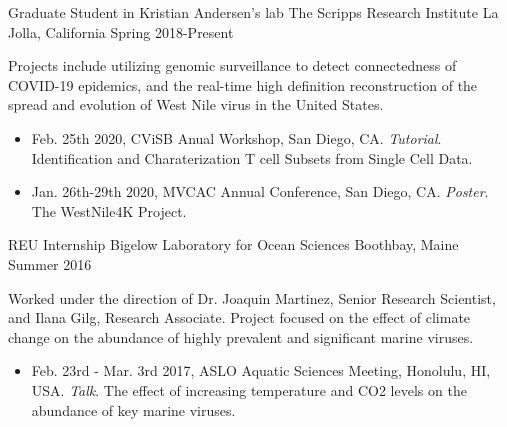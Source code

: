 
\begin{cventries}

  \cventry
    {Graduate Student in Kristian Andersen's lab} %
    {The Scripps Research Institute} %
    {La Jolla, California} %
    {Spring 2018-Present} %
    {
      \begin{cvitems} %
        \item {
          Projects include utilizing genomic surveillance to detect connectedness of COVID-19 epidemics, and the real-time high definition reconstruction of the spread and evolution of West Nile virus in the United States.
          \begin{itemize}
            \item{Feb. 25th 2020, CViSB Anual Workshop, San Diego, CA. \textit{Tutorial}. Identification and Charaterization T cell Subsets from Single Cell Data.}
            \item{Jan. 26th-29th 2020, MVCAC Annual Conference, San Diego, CA. \textit{Poster}. The WestNile4K Project.}
          \end{itemize}
        }
      \end{cvitems}
    }

  \cventry
    {REU Internship} %
    {Bigelow Laboratory for Ocean Sciences} %
    {Boothbay, Maine} %
    {Summer 2016} %
    {
      \begin{cvitems}
        \item{
          Worked under the direction of Dr. Joaquin Martinez, Senior Research Scientist, and Ilana Gilg, Research Associate.
          Project focused on the effect of climate change on the abundance of highly prevalent and significant marine viruses.
          \begin{itemize}
            \item{Feb. 23rd - Mar. 3rd 2017, ASLO Aquatic Sciences Meeting, Honolulu, HI, USA. \textit{Talk}. The effect of increasing temperature and CO2 levels on the abundance of key marine viruses.}
          \end{itemize}
        }
      \end{cvitems}
    }


\end{cventries}

